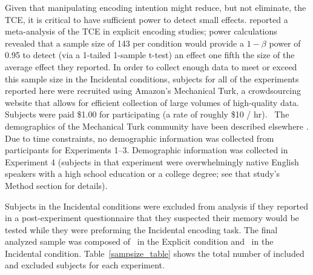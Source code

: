 \documentclass[man,natbib,floatsintext]{apa6} %
\begin{document}
Given that manipulating encoding intention might reduce, but not eliminate, the TCE, it is critical to have sufficient power to detect small effects. \citet{SedeEtal10} reported a meta-analysis of the TCE in explicit encoding studies; power calculations revealed that a sample size of 143 per condition would provide a $1-\beta$ power of 0.95 to detect (via a 1-tailed 1-sample t-test) an effect one fifth the size of the average effect they reported.
In order to collect enough data to meet or exceed this sample size in the Incidental conditions, subjects for all of the experiments reported here were recruited using Amazon's Mechanical Turk, a crowdsourcing website that allows for efficient collection of large volumes of high-quality data. Subjects were paid \$1.00 for participating (a rate of roughly \$10 / hr).~\label{TODO-10} \color{red}The demographics of the Mechanical Turk community have been described elsewhere \cite[approximately 55\% female with a mean age of 32;][]{MasoSuri12}. Due to time constraints, no demographic information was collected from participants for Experiments 1--3. Demographic information was collected in Experiment 4 (subjects in that experiment were overwhelmingly native English speakers with a high school education or a college degree; see that study's Method section for details). \color{black}

Subjects in the Incidental conditions were excluded from analysis if they reported in a post-experiment questionnaire that they suspected their memory would be tested while they were preforming the Incidental encoding task. The final analyzed sample was composed of \shoeExplicitIncluded~in the Explicit condition and \shoeIncidentalIncluded~in the Incidental condition. Table~\ref{sampsize_table} shows the total number of included and excluded subjects for each experiment.
\end{document}

